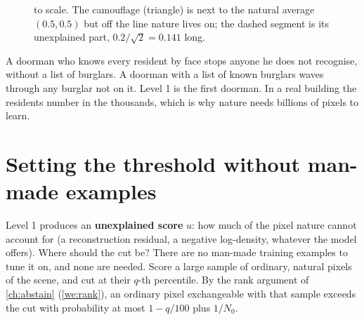 \documentclass[11pt,a4paper,oneside,openany]{book}
\begin{document}
\begin{figure}[htbp]
\centering
{}
\caption{ to scale. The camouflage (triangle) is next to the natural average $(0.5,0.5)$ but off the line nature lives on; the dashed segment is
its unexplained part, $0.2/\sqrt2=0.141$ long.}
\label{fig:openset}
\end{figure}

\begin{analogy}
A doorman who knows every resident by face stops anyone he does not recognise, without a list of burglars. A doorman with a list of known burglars waves through any
burglar not on it. Level 1 is the first doorman. In a real building the residents number in the thousands, which is why nature needs billions of pixels to learn.
\end{analogy}

\section{Setting the threshold without man-made examples}

Level 1 produces an \textbf{unexplained score} $u$: how much of the pixel nature cannot account for (a reconstruction residual, a negative log-density,
whatever the model offers). Where should the cut be? There are no man-made training examples to tune it on, and none are needed. Score a large sample of ordinary,
natural pixels of the scene, and cut at their $q$-th percentile. By the rank argument of \cref{ch:abstain} (\cref{we:rank}), an ordinary pixel exchangeable with that
sample exceeds the cut with probability at most $1-q/100$ plus $1/N_0$.
\end{document}
